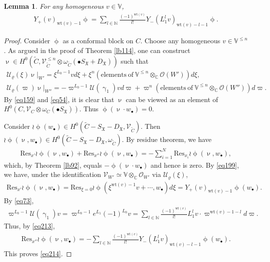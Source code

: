 \documentclass[12pt,b5paper,notitlepage]{report}
\theoremstyle{definition}
\theoremstyle{plain}
\newtheorem{lm}[df]{Lemma}
\newcommand{\fk}{\mathfrak}
\newcommand{\mc}{\mathcal}
\newcommand{\wtd}{\widetilde}
\newcommand{\Res}{\mathrm{Res}}
\newcommand{\scr}{\mathscr}
\newcommand{\SX}{S_{\fk X}}
\newcommand{\DX}{D_{\fk X}}
\newcommand{\blt}{\bullet}
\newcommand{\Vbb}{\mathbb V}
\newcommand{\Cbb}{\mathbb C}
\newcommand{\Nbb}{\mathbb N}
\newcommand{\wt}{\mathrm{wt}}
\numberwithin{equation}{section}
\begin{document}
\begin{lm}\label{lb116}
For any homogeneous $v\in\Vbb$,
\begin{align}
Y_+(v)_{\wt(v)-1}\upphi=\sum_{l\in\Nbb}\frac{(-1)^{\wt(v)}}{l!}Y_-(L_1^lv)_{\wt(v)-l-1}\upphi.\label{eq214}
\end{align}
\end{lm}
\begin{proof}
Consider $\upphi$ as a conformal block on $C$. Choose any homogeneous $v\in\Vbb^{\leq n}$.  As argued in the proof of Theorem \ref{lb114}, one can construct $\upnu\in H^0(\wtd C,\scr V_{\wtd C}^{\leq n}\otimes\omega_{\wtd C}(\blt\SX+\DX))$ such that
\begin{gather*}
\mc U_\varrho(\xi)\upnu|_{W'}=\xi^{L_0-1}vd\xi +\xi^n(\mathrm{elements~of~}\Vbb^{\leq n}\otimes_\Cbb\scr O(W'))d\xi,\\
\mc U_\varrho(\varpi)\upnu|_{W''}=-\varpi^{L_0-1}\mc U(\upgamma_1)vd\varpi+\varpi^n(\mathrm{elements~of~}\Vbb^{\leq n}\otimes_\Cbb\scr O(W''))d\varpi.
\end{gather*}
By \eqref{eq159} and \eqref{eq54}, it is clear that $\upnu$ can be viewed as an element of $H^0(C,\scr V_C\otimes\omega_C(\blt\SX))$. Thus $\upphi(\upnu\cdot w_\blt)=0$. 

Consider $\wr\upphi(w_\blt)\in H^0(\wtd C-\SX-\DX,\scr V_{\wtd C})$. Then $\wr\upphi(\upnu,w_\blt)\in H^0(\wtd C-\SX-\DX,\omega_{\wtd C})$. By residue theorem, we have
\begin{align*}
\Res_{x'}\wr\upphi(\upnu,w_\blt)+\Res_{x''}\wr\upphi(\upnu,w_\blt)=-\sum_{i=1}^N \Res_{x_i}\wr\upphi(\upnu,w_\blt),
\end{align*}
which, by Theorem \ref{lb92}, equals $-\upphi(\upnu\cdot w_\blt)$ and hence is zero. By \eqref{eq199}, we have, under the identification $\scr V_{W'}\simeq\Vbb\otimes_\Cbb\scr O_{W'}$  via $\mc U_\varrho(\xi)$,
\begin{align*}
\Res_{x'}\wr\upphi(\upnu,w_\blt)=\Res_{\xi=0}\wr\upphi(\xi^{\wt(v)-1}v+\cdots,w_\blt)d\xi=Y_+(v)_{\wt(v)-1}\upphi(w_\blt).
\end{align*}
By \eqref{eq73},
\begin{align*}
\varpi^{L_0-1}\mc U(\upgamma_1)v=\varpi^{L_0-1}e^{L_1}(-1)^{L_0}v=\sum_{l\in\Nbb}\frac{(-1)^{\wt(v)}}{l!}L_1^lv\cdot \varpi^{\wt(v)-1-l}d\varpi.
\end{align*}
Thus, by \eqref{eq213},
\begin{align*}
\Res_{x''}\wr\upphi(\upnu,w_\blt)=-\sum_{l\in\Nbb}\frac{(-1)^{\wt(v)}}{l!}Y_-(L_1^lv)_{\wt(v)-l-1}\upphi(w_\blt).
\end{align*}
This proves \eqref{eq214}.
\end{proof}
\end{document}
